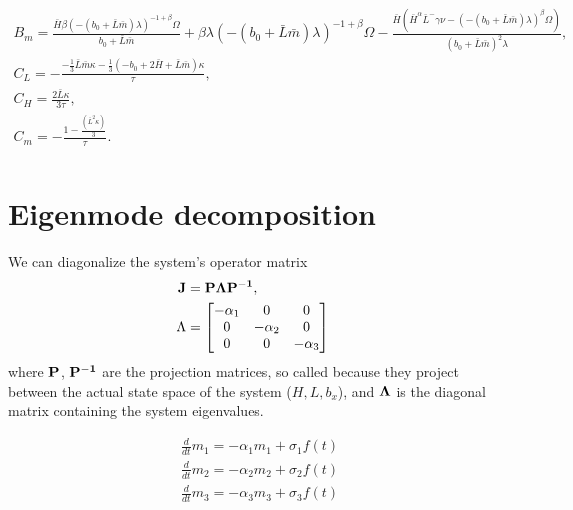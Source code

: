 \documentclass[tc, manuscript]{copernicus}
\begin{document}
\begin{multline*}
    B_m = \frac{\bar{H} \beta (-(b_0 + \bar{L} \bar{m}) \lambda)^{-1 + \beta} \Omega}{b_0 + \bar{L} \bar{m}} + \beta \lambda (-(b_0 + \bar{L} \bar{m}) \lambda)^{-1 + \beta} \Omega - \frac{\bar{H} (\bar{H}^\alpha \bar{L}^-\gamma \nu - (-(b_0 + \bar{L} \bar{m}) \lambda)^\beta \Omega)}{(b_0 + \bar{L} \bar{m})^2 \lambda}, \\
    C_L =-\frac{-\frac{1}{3} \bar{L} \bar{m} \kappa - 
  \frac{1}{3} (-b_0 + 2\bar{H} + \bar{L} \bar{m}) \kappa}{\tau}, \\
    C_H=\frac{2 \bar{L} \kappa}{3 \tau}, \\
    C_m=-\frac{1 - \frac{(\bar{L}^2 \kappa)}{3}}{\tau}. \\
\end{multline*}
     
\section{Eigenmode decomposition}     %
We can diagonalize the system's operator matrix 
\begin{align}
\bf{J} &= \bf{P} \Lambda \bf{P^{-1}},& \\
\Lambda &=  \begin{bmatrix}
   -\alpha_1 & 0 & 0  \\
   0 & -\alpha_2 & 0 \\
   0 & 0 & -\alpha_3
   \end{bmatrix}&
\end{align}
where $\bf{P}$, $\bf{P^{-1}}$ are the projection matrices, so called because they project between the actual state space of the system ($H, L, b_x$), and $\bf{\Lambda}$ is the diagonal matrix containing the system eigenvalues.

\begin{align}
\frac{d}{dt} m_1 = -\alpha_1 m_1 + \sigma_1 f(t)\\
\frac{d}{dt} m_2 = -\alpha_2 m_2 + \sigma_2 f(t)\\
\frac{d}{dt} m_3 = -\alpha_3 m_3 + \sigma_3 f(t)
\end{align}



\noappendix       %

\end{document}
